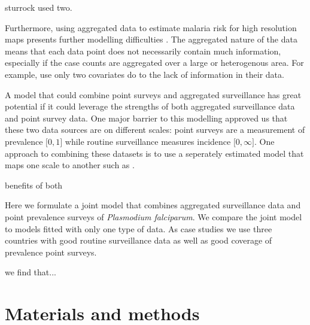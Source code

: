 \documentclass[10pt,letterpaper]{article}
\begin{document}
sturrock used two.

Furthermore, using aggregated data to estimate malaria risk for high resolution maps presents further modelling difficulties \cite{sturrock2014fine, wilson2017pointless, law2018variational, others}.
The aggregated nature of the data means that each data point does not necessarily contain much information, especially if the case counts are aggregated over a large or heterogenous area.
For example, \cite{sturrock2014fine} use only two covariates do to the lack of information in their data.

A model that could combine point surveys and aggregated surveillance has great potential if it could leverage the strengths of both aggregated surveillance data and point survey data.
One major barrier to this modelling approved us that these two data sources are on different scales: point surveys are a measurement of prevalence $\lbrack 0, 1\rbrack$ while routine surveillance measures incidence $\lbrack 0, \infty\rbrack$.
One approach to combining these datasets is to use a seperately estimated model that maps one scale to another such as \cite{cameron2015defining}.

benefits of both

Here we formulate a joint model that combines aggregated surveillance data and point prevalence surveys of \emph{Plasmodium falciparum}.
We compare the joint model to models fitted with only one type of data.
As case studies we use three countries with good routine surveillance data as well as good coverage of prevalence point surveys.


we find that...


\section*{Materials and methods}
\end{document}

